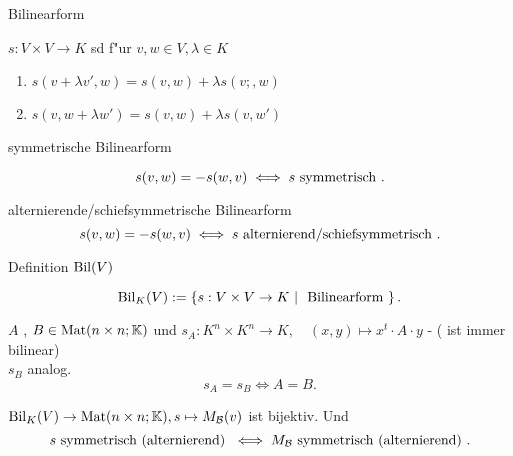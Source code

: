 \documentclass[class=article, crop=false]{standalone}
\begin{document}
\begin{flashcard}[3nc8bvje]{Bilinearform}
	\begin{definition}
		$s: V \times  V \to K$ sd f"ur $v,w \in  V, \lambda \in  K$
		\begin{enumerate}
			\item $s (v + \lambda v', w) = s (v,w ) + \lambda s ( v;, w)$
			\item $s( v, w + \lambda w') = s (v,w) + \lambda s(v,w')$
		\end{enumerate}
	\end{definition}
\end{flashcard}

\begin{flashcard}[topmyanh]{symmetrische Bilinearform}
	\begin{definition}
		\[
			s (v,w) = -s (w,v) \iff  s\text{ symmetrisch }
		.\]
	\end{definition}
\end{flashcard}

\begin{flashcard}[roj4sj5f]{alternierende/schiefsymmetrische Bilinearform}
	\[
		s (v,w ) = - s (w,v) \iff s \text{ alternierend/schiefsymmetrisch }
	.\]
\end{flashcard}

\begin{flashcard}[2knb18ae]{Definition $\operatorname{Bil}(V)$ }
	\begin{definition}
		\[
			\Bil_K(V) := \set{s: V \times  V \to  K}{\tx{Bilinearform} }
		.\]
	\end{definition}
\end{flashcard}

\begin{lemma}
	$A$ , $B \in  \operatorname{Mat}(n \times n; \mathbb{K})$ und $s_A : K^n \times K^n \to K , \quad (x,y) \mapsto x^t \cdot A \cdot  y$ - ( ist immer bilinear)\\

	$s_B$ analog.
	\[
		s_A = s_B \iff  A = B
	.\]

\end{lemma}

\begin{theorem}
	$\operatorname{Bil}_K(V) \to  \operatorname{Mat}(n \times n; \mathbb{K}), s \mapsto M_{\mathcal B}(v)$ ist bijektiv. Und
	\[
		s \text{ symmetrisch (alternierend) }  \iff M_{\mathcal B } \text{ symmetrisch (alternierend) }
	.\]

\end{theorem}
\end{document}
